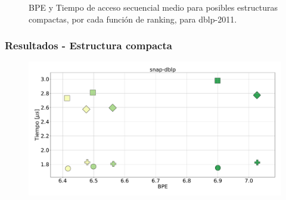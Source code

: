 \begin{frame}
\begin{figure}
\begin{minipage}{1\textwidth}
\begin{minipage}{0.15\textwidth}
    		\end{minipage}	
    	\end{minipage}

	\caption{BPE y Tiempo de acceso secuencial medio para posibles estructuras compactas, por cada función de ranking, para dblp-2011.}
\end{figure}

\end{frame}

\begin{frame}
\frametitle{Resultados - Estructura compacta}

\begin{figure}
	\centering
	
    	\begin{minipage}{1\textwidth}
    		\centering
    		\begin{minipage}{0.8\textwidth}
    			\centering
    			\includegraphics[width=1\linewidth]{../img/sdsl/secuencialBig/snap-dblp.pdf}
    		\end{minipage}
    		\begin{minipage}{0.15\textwidth}
    			\centering

\end{minipage}
\end{minipage}
\end{figure}
\end{frame}
